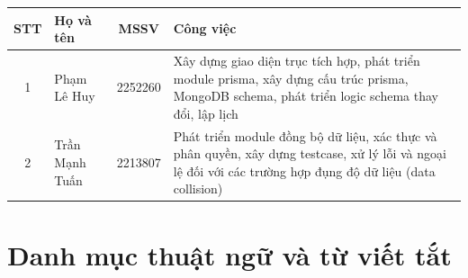 \documentclass[twoside, final]{hcmut-report}
\begin{document}
\begin{center}
\begin{tabular}{c p{3.5cm} c p{7cm}}
    \toprule
    \textbf{STT} &
    \textbf{Họ và tên} &
    \textbf{MSSV} &
    \textbf{Công việc} \\
    \midrule

    1 & Phạm Lê Huy
    & 2252260
    & Xây dựng giao diện trục tích hợp, phát triển module prisma,
      xây dựng cấu trúc prisma, MongoDB schema, phát triển logic
      schema thay đổi, lập lịch \\

    2 & Trần Mạnh Tuấn
    & 2213807
    & Phát triển module đồng bộ dữ liệu, xác thực và phân quyền,
      xây dựng testcase, xử lý lỗi và ngoại lệ đối với các trường hợp
      đụng độ dữ liệu (data collision) \\

    \bottomrule
\end{tabular}
\end{center}

\clearpage



\tableofcontents
\listoffigures
\listoftables

\newpage
\section*{Danh mục thuật ngữ và từ viết tắt}
\end{document}
